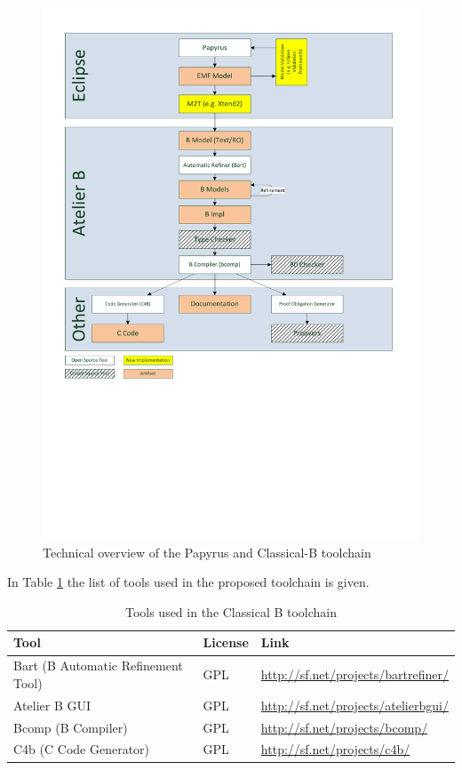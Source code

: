 \begin{figure}
  \centering
  \includegraphics[width=6in]{images/classical_b_toolchain.pdf}
  \caption{Technical overview of the Papyrus and Classical-B toolchain}
  \label{fig:classical-b-toolchain}
\end{figure}


In Table \ref{tab:classical-b-tools} the list of tools used in the
proposed toolchain is given.

\begin{center}
\begin{table}
  \begin{tabular}{ l | l | l }
    Tool                               & License & Link \\ 
    \hline \hline
    Bart (B Automatic Refinement Tool) & GPL & \url{http://sf.net/projects/bartrefiner/} \\ \hline
    Atelier B GUI                      & GPL & \url{http://sf.net/projects/atelierbgui/} \\ \hline
    Bcomp (B Compiler)                 & GPL & \url{http://sf.net/projects/bcomp/} \\ \hline
    C4b (C Code Generator)             & GPL & \url{http://sf.net/projects/c4b/} \\ \hline
    \hline
  \end{tabular}
  \caption{Tools used in the Classical B toolchain}
  \label{tab:classical-b-tools}
\end{table}
\end{center}

